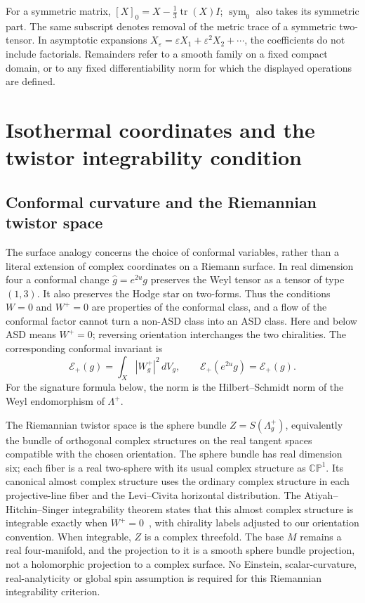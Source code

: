 \documentclass[11pt]{article}
\numberwithin{equation}{section}
\theoremstyle{definition}
\theoremstyle{remark}
\newcommand{\CP}{\mathbb{CP}}
\begin{document}
For a symmetric matrix, \([X]_0=X-\tfrac13\operatorname{tr}(X)I\); \(\operatorname{sym}_0\) also takes its symmetric part. The same subscript denotes removal of the metric trace of a symmetric two-tensor. In asymptotic expansions \(X_\varepsilon=\varepsilon X_1+\varepsilon^2X_2+\cdots\), the coefficients do not include factorials. Remainders refer to a smooth family on a fixed compact domain, or to any fixed differentiability norm for which the displayed operations are defined.



\section{Isothermal coordinates and the twistor integrability condition}
\label{sec:ctx-isothermal}

\subsection{Conformal curvature and the Riemannian twistor space}

The surface analogy concerns the choice of conformal variables, rather
than a literal extension of complex coordinates on a Riemann surface.
In real dimension four a conformal change $\widehat g=e^{2u}g$ preserves the
Weyl tensor as a tensor of type $(1,3)$.  It also preserves the Hodge star
on two-forms.  Thus the conditions $W=0$ and $W^+=0$ are properties of
the conformal class, and a flow of the conformal factor cannot turn a
non-ASD class into an ASD class.  Here and below ASD means $W^+=0$;
reversing orientation interchanges the two chiralities.  The corresponding
conformal invariant is
\begin{equation}\label{eq:ctx-Weyl-energy}
 \mathcal E_+(g)=\int_X|W^+_g|^2\,dV_g,
 \qquad \mathcal E_+(e^{2u}g)=\mathcal E_+(g).
\end{equation}
For the signature formula below, the norm is the Hilbert--Schmidt norm
of the Weyl endomorphism of $\Lambda^+$.

The Riemannian twistor space is the sphere bundle
$Z=S(\Lambda_g^+)$, equivalently the bundle of orthogonal complex
structures on the real tangent spaces compatible with the chosen orientation.
The sphere bundle has real dimension six; each fiber is a real two-sphere
with its usual complex structure as $\CP^1$. Its canonical
almost complex structure uses the ordinary complex structure in each
projective-line fiber and the Levi--Civita horizontal distribution.
The Atiyah--Hitchin--Singer integrability theorem states that this almost
complex structure is integrable exactly when $W^+=0$~\cite{AHS1978},
with chirality labels adjusted to our orientation convention. When
integrable, $Z$ is a complex threefold. The base $M$
remains a real four-manifold, and the projection to it is a smooth sphere
bundle projection, not a holomorphic projection to a complex surface.
No Einstein, scalar-curvature, real-analyticity or global spin assumption
is required for this Riemannian integrability criterion.
\end{document}
